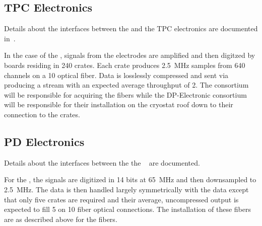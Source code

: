 
\subsection{TPC Electronics}
\label{sec:fd-daq-intfc-elec}

Details about the interfaces between the  and the 
 TPC electronics are documented in~\cite{docdb6778}.

In the case of the  , signals from the
 electrodes are amplified and then digitzed by 
boards residing in 240  crates. 
Each crate produces \SI{2.5}{\MHz} samples from 640 channels on a
\SI{10}{\Gbps} optical fiber. 
Data is losslessly compressed and sent via  producing a
stream with an expected average throughput of \SI{2}{\Gbps}.
The  consortium will be responsible for acquiring the fibers while
the DP-Electronic consortium will be responsible for their
installation on the cryostat roof down to their connection to the
 crates.


\subsection{PD Electronics}
\label{sec:fd-daq-intfc-photon}

Details about the interfaces between the  the 
~\cite{docdb6802} are documented. 


For the  , the signals are digitized in 14 bits
at \SI{65}{\MHz} and then downsampled to \SI{2.5}{\MHz}. 
The data is then handled largely symmetrically with the 
data except that only five  crates are required and their
average, uncompressed output is expected to fill \SI{5}{\Gbps} on
\SI{10}{\Gbps} fiber optical connections. 
The installation of these fibers are as described above for the
 fibers.

